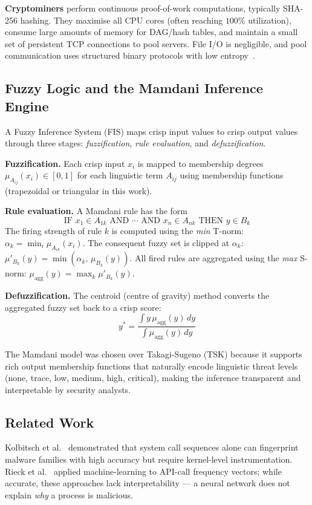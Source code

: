 \documentclass[conference]{IEEEtran}
\begin{document}
\textbf{Cryptominers} perform continuous proof-of-work computations,
typically SHA-256 hashing. They maximise all CPU cores (often reaching
$100\%$ utilization), consume large amounts of memory for DAG/hash tables,
and maintain a small set of persistent TCP connections to pool servers.
File I/O is negligible, and pool communication uses structured binary
protocols with low entropy~\cite{gomes2021detecting}.

\subsection{Fuzzy Logic and the Mamdani Inference Engine}

A Fuzzy Inference System (FIS) maps crisp input values to crisp output
values through three stages: \textit{fuzzification},
\textit{rule evaluation}, and \textit{defuzzification}.

\textbf{Fuzzification.} Each crisp input $x_i$ is mapped to membership
degrees $\mu_{A_{ij}}(x_i) \in [0,1]$ for each linguistic term $A_{ij}$
using membership functions (trapezoidal or triangular in this work).

\textbf{Rule evaluation.} A Mamdani rule has the form
\[
  \text{IF } x_1 \in A_{1k} \text{ AND } \cdots \text{ AND }
  x_n \in A_{nk}
  \text{ THEN } y \in B_k
\]
The firing strength of rule $k$ is computed using the \textit{min}
T-norm: $\alpha_k = \min_i \mu_{A_{ik}}(x_i)$. The consequent fuzzy
set is clipped at $\alpha_k$: $\mu'_{B_k}(y) = \min(\alpha_k,\,\mu_{B_k}(y))$.
All fired rules are aggregated using the \textit{max} S-norm:
$\mu_{\text{agg}}(y) = \max_k \mu'_{B_k}(y)$.

\textbf{Defuzzification.} The centroid (centre of gravity) method
converts the aggregated fuzzy set back to a crisp score:
\[
  y^* = \frac{\int y\,\mu_{\text{agg}}(y)\,dy}
             {\int \mu_{\text{agg}}(y)\,dy}
\]

The Mamdani model was chosen over Takagi-Sugeno (TSK) because it supports
rich output membership functions that naturally encode linguistic threat
levels (none, trace, low, medium, high, critical), making the inference
transparent and interpretable by security analysts.

\subsection{Related Work}

Kolbitsch et al.~\cite{kolbitsch2009} demonstrated that system call
sequences alone can fingerprint malware families with high accuracy but
require kernel-level instrumentation. Rieck et al.~\cite{rieck2011}
applied machine-learning to API-call frequency vectors; while accurate,
these approaches lack interpretability --- a neural network does not
explain \emph{why} a process is malicious.
\end{document}
